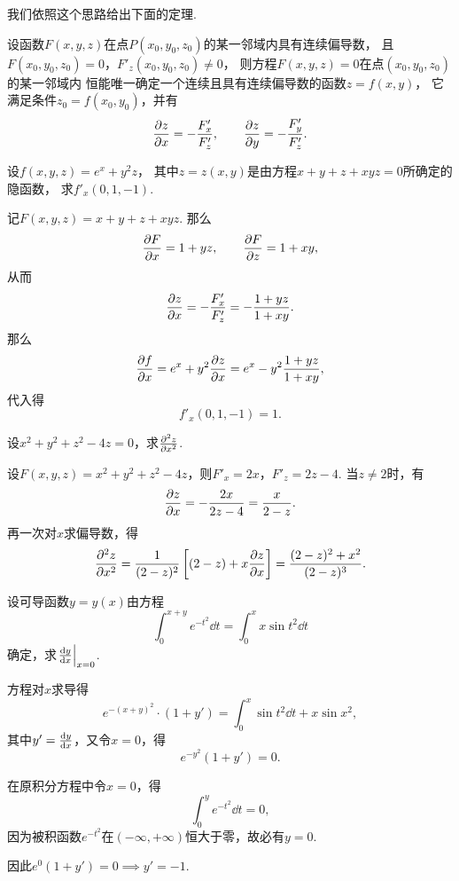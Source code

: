 我们依照这个思路给出下面的定理.
\begin{theorem}[隐函数存在定理2]\label{theorem:多元函数微分法.隐函数存在定理2}
设函数\(F(x,y,z)\)在点\(P(x_0,y_0,z_0)\)的某一邻域内具有连续偏导数，
且\(F(x_0,y_0,z_0)=0\)，\(F'_z(x_0,y_0,z_0) \neq 0\)，
则方程\(F(x,y,z)=0\)在点\((x_0,y_0,z_0)\)的某一邻域内
恒能唯一确定一个连续且具有连续偏导数的函数\(z=f(x,y)\)，
它满足条件\(z_0=f(x_0,y_0)\)，并有
\begin{equation}\label{equation:多元函数微分法.隐函数存在定理2.一阶偏导数}
	\pdv{z}{x}=-\frac{F'_x}{F'_z},
	\qquad
	\pdv{z}{y}=-\frac{F'_y}{F'_z}.
\end{equation}
\end{theorem}

\begin{example}
设\(f(x,y,z) = e^x + y^2 z\)，
其中\(z=z(x,y)\)是由方程\(x+y+z+xyz=0\)所确定的隐函数，
求\(f'_x(0,1,-1)\).
\begin{solution}
记\(F(x,y,z) = x+y+z+xyz\).
那么\[
	\pdv{F}{x} = 1+yz, \qquad
	\pdv{F}{z} = 1+xy,
\]
从而\[
	\pdv{z}{x} = -\frac{F'_x}{F'_z}
	= -\frac{1+yz}{1+xy}.
\]
那么\[
	\pdv{f}{x}
	= e^x + y^2 \pdv{z}{x}
	= e^x - y^2 \frac{1+yz}{1+xy},
\]
代入得\[
	f'_x(0,1,-1) = 1.
\]
\end{solution}
\end{example}

\begin{example}
设\(x^2+y^2+z^2-4z=0\)，求\(\pdv[2]{z}{x}\).
\begin{solution}
设\(F(x,y,z) = x^2+y^2+z^2-4z\)，则\(F'_x = 2x\)，\(F'_z = 2z-4\).
当\(z\neq2\)时，有\[
	\pdv{z}{x} = -\frac{2x}{2z-4} = \frac{x}{2-z}.
\]
再一次对\(x\)求偏导数，得\[
	\pdv[2]{z}{x}
	= \frac{1}{(2-z)^2} \left[ (2-z)+x\pdv{z}{x} \right]
	= \frac{(2-z)^2+x^2}{(2-z)^3}.
\]
\end{solution}
\end{example}

\begin{example}
设可导函数\(y = y(x)\)由方程\[
\int_0^{x+y} e^{-t^2} \dd{t}
= \int_0^x x \sin t^2 \dd{t}
\]确定，求\(\eval{\dv{y}{x}}_{x=0}\).
\begin{solution}
方程对\(x\)求导得\[
	e^{-(x+y)^2} \cdot (1+y')
	= \int_0^x \sin t^2 \dd{t} + x \sin x^2,
\]
其中\(y' = \dv{y}{x}\)，又令\(x=0\)，得\[
	e^{-y^2} (1+y') = 0.
\]

在原积分方程中令\(x=0\)，得\[
	\int_0^y e^{-t^2} \dd{t} = 0,
\]
因为被积函数\(e^{-t^2}\)在\((-\infty,+\infty)\)恒大于零，故必有\(y = 0\).

因此\(e^0 (1+y') = 0 \implies y'=-1\).
\end{solution}
\end{example}


